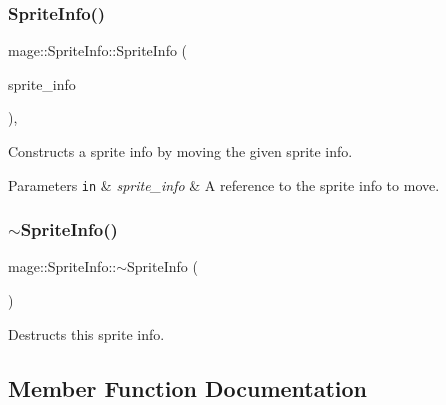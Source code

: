 \subsubsection{\texorpdfstring{Sprite\+Info()}{SpriteInfo()}\hspace{0.1cm}{\footnotesize\ttfamily [3/3]}}
{\footnotesize\ttfamily mage\+::\+Sprite\+Info\+::\+Sprite\+Info (\begin{DoxyParamCaption}\item[{\hyperlink{structmage_1_1_sprite_info}{Sprite\+Info} \&\&}]{sprite\+\_\+info }\end{DoxyParamCaption})\hspace{0.3cm}{\ttfamily [default]}, {\ttfamily [noexcept]}}

Constructs a sprite info by moving the given sprite info.


\begin{DoxyParams}[1]{Parameters}
\mbox{\tt in}  & {\em sprite\+\_\+info} & A reference to the sprite info to move. \\
\hline
\end{DoxyParams}
\hypertarget{structmage_1_1_sprite_info_a17d9161b88c7f920419ae9aaf8c11299}{}\label{structmage_1_1_sprite_info_a17d9161b88c7f920419ae9aaf8c11299} 
\subsubsection{\texorpdfstring{$\sim$\+Sprite\+Info()}{~SpriteInfo()}}
{\footnotesize\ttfamily mage\+::\+Sprite\+Info\+::$\sim$\+Sprite\+Info (\begin{DoxyParamCaption}{ }\end{DoxyParamCaption})\hspace{0.3cm}{\ttfamily [default]}}

Destructs this sprite info. 

\subsection{Member Function Documentation}
\hypertarget{structmage_1_1_sprite_info_a97d38ed21effc2aca62c99acd7a54d19}{}\label{structmage_1_1_sprite_info_a97d38ed21effc2aca62c99acd7a54d19} 
